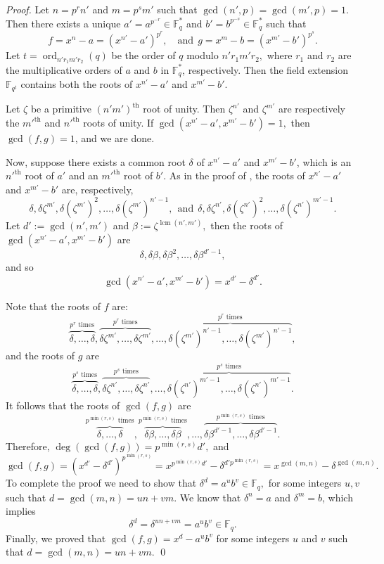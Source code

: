 \documentclass[12pt]{elsarticle}
\newcommand{\Fq}{\mathbb{F}_{q}}
\DeclareMathOperator{\lcm}{lcm}
\theoremstyle{break}
{\theorembodyfont{\upshape}
    \newtheorem{theorem}{Theorem}[section] %
    \newtheorem{lemma}[theorem]{Lemma} %
    \newtheorem{proposition}[theorem]{Proposition}
    \newtheorem{corollary}[theorem]{Corollary}
    \newtheorem{definition}[theorem]{Definition}
    \newtheorem{example}[theorem]{Example}
    \newtheorem{remark}[theorem]{Remark}
    \newtheorem{conjecture}[theorem]{Conjecture}
    \newtheorem*{proof}{{Proof}}
	\newtheorem*{notation}{Notation}
	\newtheorem*{main}{Cain Theorem}
	\newtheorem*{problem}{Problem}
}
\begin{document}
\begin{proof}
  Let $n= p^r n'$ and $m= p^s m'$ such that $\gcd(n', p) = \gcd(m', p) = 1$.  Then there exists a unique $a'=a^{p^{-r}} \in \mathbb{F}_q^{*}$ and $b'=b^{p^{-s}} \in \mathbb{F}_q^{*}$ such that    
$$f = x^n - a  = \left(x^{n'} - a'\right)^{p^r}, \quad \text{and} \ \ g = x^m - b  = \left(x^{m'} - b'\right)^{p^s}.$$
 Let $t = \operatorname{ord}_{n' r_1 m' r_2}(q)$ be the order of $q$ modulo $n' r_1 m' r_2,$  where $r_1$ and $r_2$ are the multiplicative orders of $a$ and $b$ in $\mathbb{F}_q^{*}$, respectively. Then the field extension $\mathbb{F}_{q^t}$ contains both the roots of $x^{n'} - a'$ and $x^{m'} - b'$. 
 
Let $\zeta$ be a primitive $(n' m')^{\text{th}}$ root of unity. Then $\zeta^{n'}$ and $\zeta^{m'}$ are respectively the $m'^{\text{th}}$ and $n'^{\text{th}}$ roots of unity. If $\gcd(x^{n'} - a', x^{m'} - b') = 1,$ then $\gcd(f, g) = 1$, and we are done.

Now, suppose there exists a common root $\delta$ of $x^{n'} - a'$ and $x^{m'} - b'$, which is an $n'^{\text{th}}$ root of $a'$ and an $m'^{\text{th}}$ root of $b'$. As in the proof of \cite[Theorem 4.1]{Aydin2017}, the roots of $x^{n'} - a'$ and $x^{m'} - b'$ are, respectively,
$$ \delta, \delta \zeta^{m'}, \delta (\zeta^{m'})^2, \ldots, \delta (\zeta^{m'})^{n'-1}, \ \   \text{and} \ \ \delta, \delta \zeta^{n'}, \delta (\zeta^{n'})^2, \ldots, \delta (\zeta^{n'})^{m'-1} .  $$
Let $d' := \gcd(n', m')$ and $\beta := \zeta^{\lcm{(n', m')}},$ then the roots of $\gcd(x^{n'} - a', x^{m'} - b')$ are 
$$   \delta, \delta \beta, \delta \beta^2, \ldots, \delta \beta^{d' - 1},  $$
and so  
$$ \gcd(x^{n'} - a', x^{m'} - b') = x^{d'} - \delta^{d'} .$$

Note that the roots of $f$  are: 
$$ \overbrace{\delta,  \ldots, \delta}^{p^r \text{ times}}, \overbrace{\delta \zeta^{m'},  \ldots, \delta \zeta^{m'}}^{p^r \text{ times}}, \ldots,  \overbrace{\delta (\zeta^{m'})^{n'-1},  \ldots, \delta (\zeta^{m'})^{n'-1}}^{p^r \text{ times}},  $$
and the roots of $g$ are
$$ \overbrace{\delta,  \ldots, \delta}^{p^s \text{ times}}, \overbrace{\delta \zeta^{n'},  \ldots, \delta \zeta^{n'}}^{p^s \text{ times}}, \ldots,  \overbrace{\delta (\zeta^{n'})^{m'-1},  \ldots, \delta (\zeta^{n'})^{m'-1}}^{p^s \text{ times}}.  $$ 
It follows that the roots of $ \gcd(f, g)$ are
$$ \overbrace{\delta,  \ldots, \delta}^{p^{\min(r, s)}  \text{ times}}, \overbrace{\delta \beta,  \ldots, \delta \beta}^{p^{\min(r, s)} \text{ times}}, \ldots,  
\overbrace{\delta \beta^{d' - 1},  \ldots, \delta \beta^{d' - 1}}^{p^{\min(r, s)} \text{ times}}.  $$
Therefore, $\deg(\gcd(f, g)) = p^{\min(r, s)} d',$ and 
$$   \gcd(f, g) = \left(x^{d'} - \delta^{d'}\right)^{p^{\min(r, s)}} =  x^{p^{\min(r, s)} d'} - \delta^{d' p^{\min(r, s)}}=x^{\gcd(m,n)} - \delta^{\gcd(m,n)}.$$
To complete the proof we need to show that $\delta^d= a^u  b^v\in \Fq, $ for some integers   $u, v$ such that $d= \gcd(m,n)=u n+v m$.
We know that $\delta^{n}=a$ and $\delta^{m}=b$, which implies
$$
\delta^d=\delta^{u n+v m}=a^u  b^v \in \mathbb{F}_q.
$$
Finally, we proved that $ \gcd(f, g) = x^{d} -  a^u b^v $  for some integers $ u $ and $ v $ such that $ d = \gcd(m, n) = u n + v m $.
\qed
\end{proof}
\end{document}
